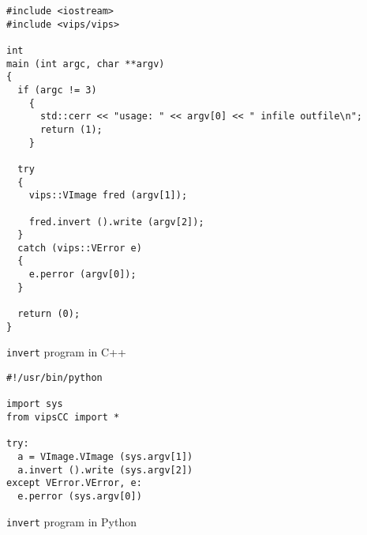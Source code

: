 \begin{fig2}
\begin{verbatim}
#include <iostream>
#include <vips/vips>

int
main (int argc, char **argv)
{
  if (argc != 3)
    {
      std::cerr << "usage: " << argv[0] << " infile outfile\n";
      return (1);
    }

  try
  {
    vips::VImage fred (argv[1]);

    fred.invert ().write (argv[2]);
  }
  catch (vips::VError e)
  {
    e.perror (argv[0]);
  }

  return (0);
}
\end{verbatim}
\caption{\texttt{invert} program in C++}
\label{fg:invert-c++}
\end{fig2}

\begin{fig2}
\begin{verbatim}
#!/usr/bin/python

import sys
from vipsCC import *

try:
  a = VImage.VImage (sys.argv[1])
  a.invert ().write (sys.argv[2])
except VError.VError, e:
  e.perror (sys.argv[0])
\end{verbatim}
\caption{\texttt{invert} program in Python}
\label{fg:invert-py}
\end{fig2}
